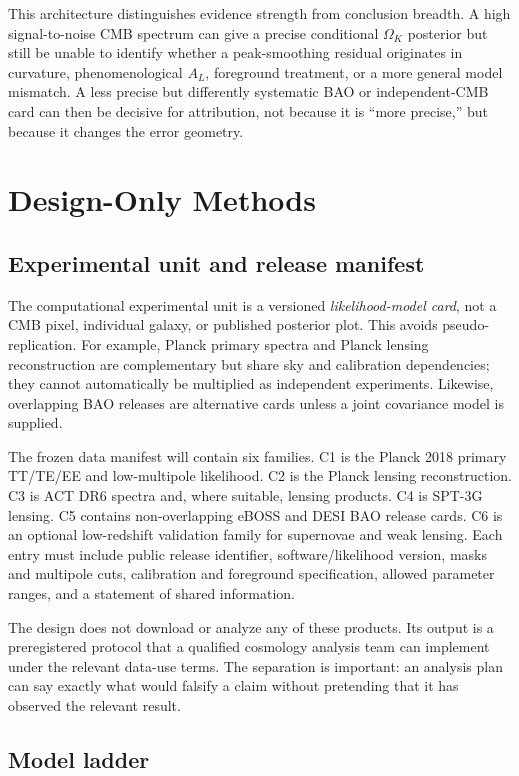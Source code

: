 \documentclass[conference]{IEEEtran}
\newcommand{\ok}{\ensuremath{\Omega_K}}
\begin{document}
This architecture distinguishes evidence strength from conclusion breadth. A high signal-to-noise CMB spectrum can give a precise conditional $\ok$ posterior but still be unable to identify whether a peak-smoothing residual originates in curvature, phenomenological $A_L$, foreground treatment, or a more general model mismatch. A less precise but differently systematic BAO or independent-CMB card can then be decisive for attribution, not because it is ``more precise,'' but because it changes the error geometry.

\section{Design-Only Methods}

\subsection{Experimental unit and release manifest}

The computational experimental unit is a versioned \emph{likelihood-model card}, not a CMB pixel, individual galaxy, or published posterior plot. This avoids pseudo-replication. For example, Planck primary spectra and Planck lensing reconstruction are complementary but share sky and calibration dependencies; they cannot automatically be multiplied as independent experiments. Likewise, overlapping BAO releases are alternative cards unless a joint covariance model is supplied.

The frozen data manifest will contain six families. C1 is the Planck 2018 primary TT/TE/EE and low-multipole likelihood. C2 is the Planck lensing reconstruction. C3 is ACT DR6 spectra and, where suitable, lensing products. C4 is SPT-3G lensing. C5 contains non-overlapping eBOSS and DESI BAO release cards. C6 is an optional low-redshift validation family for supernovae and weak lensing. Each entry must include public release identifier, software/likelihood version, masks and multipole cuts, calibration and foreground specification, allowed parameter ranges, and a statement of shared information.

The design does not download or analyze any of these products. Its output is a preregistered protocol that a qualified cosmology analysis team can implement under the relevant data-use terms. The separation is important: an analysis plan can say exactly what would falsify a claim without pretending that it has observed the relevant result.

\subsection{Model ladder}
\end{document}
